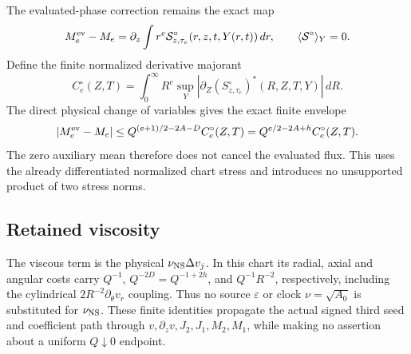 The evaluated-phase correction remains the exact map
\[
M_e^{\rm ev}-M_e=\partial_z\int r^e
 \mathcal S^\circ_{z,\tau_e}(r,z,t,Y(r,t))\,dr,\qquad
 \langle\mathcal S^\circ\rangle_Y=0 .
\]
Define the finite normalized derivative majorant
\[
C_e^\circ(Z,T)=\int_0^\infty R^e\sup_Y
 \left|\partial_Z(S^\circ_{z,\tau_e})^*(R,Z,T,Y)\right|\,dR .
\]
The direct physical change of variables gives the exact finite envelope
\[
|M_e^{\rm ev}-M_e|\le Q^{(e+1)/2-2A-D}C_e^\circ(Z,T)
 =Q^{e/2-2A+h}C_e^\circ(Z,T).
\]
The zero auxiliary mean therefore does not cancel the evaluated flux.  This
uses the already differentiated normalized chart stress and introduces no
unsupported product of two stress norms.

\subsection{Retained viscosity}
The viscous term is the physical \(\nu_{\rm NS}\Delta v_j\).  In this chart
its radial, axial and angular costs carry \(Q^{-1}\), \(Q^{-2D}=Q^{-1+2h}\),
and \(Q^{-1}R^{-2}\), respectively, including the cylindrical
\(2R^{-2}\partial_\theta v_r\) coupling.  Thus no source \(\varepsilon\)
or clock \(\nu=\sqrt{A_0}\) is substituted for \(\nu_{\rm NS}\).  These
finite identities propagate the actual signed third seed and coefficient
path through \(v,\partial_zv,J_2,J_1,M_2,M_1\), while making no assertion
about a uniform \(Q\downarrow0\) endpoint.
\label{qext:conclusion}
